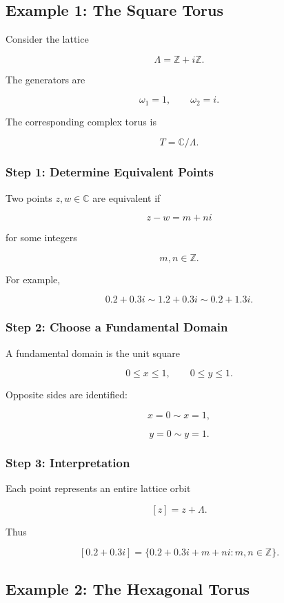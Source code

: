 \documentclass[12pt,a4paper]{article}
\theoremstyle{notespace}
\begin{document}
\subsection{Example 1: The Square Torus}

Consider the lattice

\[
\Lambda
=
\mathbb Z+i\mathbb Z.
\]

The generators are

\[
\omega_1=1,
\qquad
\omega_2=i.
\]

The corresponding complex torus is

\[
T
=
\mathbb C/\Lambda.
\]

\subsubsection*{Step 1: Determine Equivalent Points}

Two points \(z,w\in\mathbb C\) are equivalent if

\[
z-w=m+ni
\]

for some integers

\[
m,n\in\mathbb Z.
\]

For example,

\[
0.2+0.3i
\sim
1.2+0.3i
\sim
0.2+1.3i.
\]

\subsubsection*{Step 2: Choose a Fundamental Domain}

A fundamental domain is the unit square

\[
0\le x\le 1,
\qquad
0\le y\le 1.
\]

Opposite sides are identified:

\[
x=0\sim x=1,
\]

\[
y=0\sim y=1.
\]

\subsubsection*{Step 3: Interpretation}

Each point represents an entire lattice orbit

\[
[z]
=
z+\Lambda.
\]

Thus

\[
[0.2+0.3i]
=
\{
0.2+0.3i+m+ni
:
m,n\in\mathbb Z
\}.
\]

\subsection{Example 2: The Hexagonal Torus}
\end{document}
